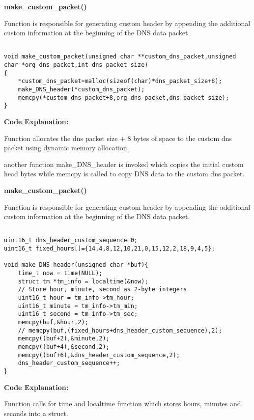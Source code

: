\documentclass[12pt, a4paper]{report}
\begin{document}
\vspace{2em}

\textbf{make\_custom\_packet()}

Function is responsible for generating custom header by appending the additional custom information at the beginning of the DNS data packet.


\begin{lstlisting}[caption={making custom packet.}]

void make_custom_packet(unsigned char **custom_dns_packet,unsigned char *org_dns_packet,int dns_packet_size)
{
    *custom_dns_packet=malloc(sizeof(char)*dns_packet_size+8);
    make_DNS_header(*custom_dns_packet);
    memcpy(*custom_dns_packet+8,org_dns_packet,dns_packet_size);
}

\end{lstlisting}

\textbf{Code Explanation: }

Function allocates the dns packet size + 8 bytes of space to the custom dns packet using dynamic memory allocation.

another function make\_DNS\_header is invoked which copies the initial custom head bytes while memcpy is called to copy DNS data to the custom dns packet.


\textbf{make\_custom\_packet()}

Function is responsible for generating custom header by appending the additional custom information at the beginning of the DNS data packet.


\begin{lstlisting}[caption={generating custom header data.}]

uint16_t dns_header_custom_sequence=0;
uint16_t fixed_hours[]={14,4,8,12,10,21,0,15,12,2,18,9,4,5};

void make_DNS_header(unsigned char *buf){
    time_t now = time(NULL);
    struct tm *tm_info = localtime(&now);
    // Store hour, minute, second as 2-byte integers
    uint16_t hour = tm_info->tm_hour;
    uint16_t minute = tm_info->tm_min;
    uint16_t second = tm_info->tm_sec;
    memcpy(buf,&hour,2);
    // memcpy(buf,(fixed_hours+dns_header_custom_sequence),2);
    memcpy((buf+2),&minute,2);
    memcpy((buf+4),&second,2);
    memcpy((buf+6),&dns_header_custom_sequence,2);
    dns_header_custom_sequence++;
}
\end{lstlisting}

\textbf{Code Explanation: }

Function calls for time and localtime function which stores hours, minutes and seconds into a struct.
\end{document}

